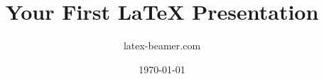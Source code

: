 \documentclass{beamer}
\title{Your First \LaTeX{} Presentation}
\author{latex-beamer.com}
\date{\today}
\begin{document}
\begin{frame}
    \titlepage
\end{frame}





\end{document}

